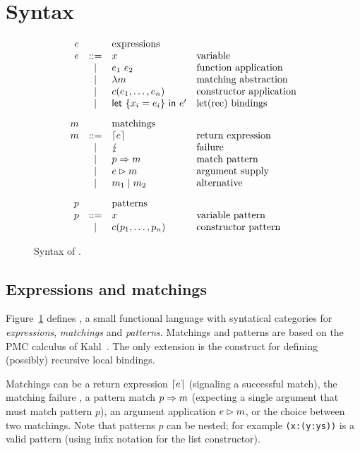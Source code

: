 \section{Syntax}\label{sec:syntax}

\begin{figure}
  \[
    \begin{array}{rcll}
      e & &     \text{expressions} \\
      e & ::= &  x  & \text{variable} \\
      & | &  e_1~e_2 & \text{function application} \\
      & | & \lambda m & \text{matching abstraction} \\
      & | &  c(e_1,\ldots,e_n) & \text{constructor application} \\
      & | & \textsf{let}~\{x_i=e_i\}~\textsf{in}~e' & \text{let(rec) bindings} \\[2ex]
      m &  & \text{matchings} \\
      m & ::= & \left\lceil e\right\rceil & \text{return expression}\\
      & | & \lightning & \text{failure} \\
      & | & p \Rightarrow m & \text{match pattern} \\
      & | & e\rhd m & \text{argument supply}\\
      & | & m_1 \mid m_2 & \text{alternative}\\[2ex]
      p & & \text{patterns}\\
      p & ::= & x & \text{variable pattern} \\
      & | & c(p_1,\ldots,p_n) & \text{constructor pattern} 
  \end{array}
\]
\caption{Syntax of \lambdaPMC.}\label{fig:syntax}
\end{figure}

\subsection{Expressions and matchings}
Figure~\ref{fig:syntax} defines \lambdaPMC, a small functional
language with syntatical categories for \emph{expressions},
\emph{matchings} and \emph{patterns}.  Matchings and patterns are
based on the PMC calculus of Kahl~\cite{kahl_2004}.
The only extension is the \llet{\ldots}{\ldots} construct
for defining (possibly) recursive local bindings.

Matchings can be a return expression $\left\lceil e\right\rceil$ (signaling a
successful match), the matching failure \matchfail,
a pattern match $p \Rightarrow m$ (expecting a
single argument that must match pattern $p$), an argument application
$e\rhd m$, or the choice  between two
matchings.  Note that patterns $p$ can be nested; for example
\verb|(x:(y:ys))| is a valid pattern (using infix notation for the
list constructor).

